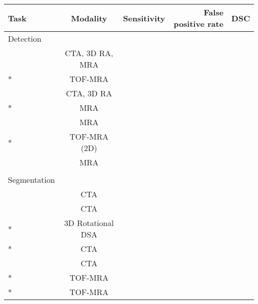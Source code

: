 




\begin{table}[t]
	\centering
	\begin{tabular}{l c r r r}
		Task & Modality & Sensitivity & False positive rate & DSC \\
		\hline
		Detection & & & & \\
		\hspace{5mm}\citeauthor{Hentschke2014} & CTA, 3D RA, MRA & & & \\
		\hspace{5mm}\citeauthor{Joo2020}* & TOF-MRA & & & \\
		\hspace{5mm}\citeauthor{Lauric2010} & CTA, 3D RA & & & \\
		\hspace{5mm}\citeauthor{Nakao2018}* & MRA & & & \\
		\hspace{5mm}\citeauthor{Suniaga2012} & MRA & & & \\
		\hspace{5mm}\citeauthor{Ueda2019}* & TOF-MRA (2D) & & & \\
		\hspace{5mm}\citeauthor{Yang2011} & MRA & & & \\		
		& & & & \\
		Segmentation & & & & \\
		\hspace{5mm}\citeauthor{Bogunovic2011} & CTA & & & \\
		\hspace{5mm}\citeauthor{Firouzian2011} & CTA & & & \\
		\hspace{5mm}\citeauthor{Liu2021}*  & 3D Rotational DSA & & & \\
		\hspace{5mm}\citeauthor{Park2019}* & CTA & & & \\
		\hspace{5mm}\citeauthor{Sen2013} & CTA & & & \\
		\hspace{5mm}\citeauthor{Sichermann2019}* & TOF-MRA & & & \\
		\hspace{5mm}\citeauthor{Yang2020}* & TOF-MRA & & & \\

	\end{tabular}
	\caption{ }
	\label{table:related_work}
\end{table}







